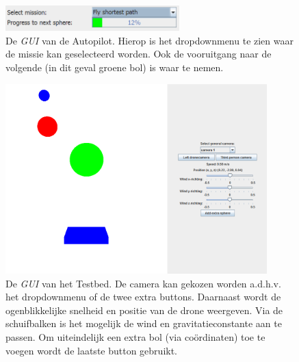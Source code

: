 \begin{figure}[h]
	\centering
	\includegraphics[width=0.6\textwidth]{AutopilotGUI.png}
	\caption{De \textit{GUI} van de Autopilot. Hierop is het dropdownmenu te zien waar de missie kan geselecteerd worden. Ook de vooruitgang naar de volgende (in dit geval groene bol) is waar te nemen.}
\end{figure}
\begin{figure}[h]
	\centering
	\includegraphics[width=0.9\textwidth]{TestbedGUI.png}
	\caption{De \textit{GUI} van het Testbed. De camera kan gekozen worden a.d.h.v. het dropdownmenu of de twee extra buttons. Daarnaast wordt de ogenblikkelijke snelheid en positie van de drone weergeven. Via de schuifbalken is het mogelijk de wind en gravitatieconstante aan te passen. Om uiteindelijk een extra bol (via co\"ordinaten) toe te voegen wordt de laatste button gebruikt.}
\end{figure}